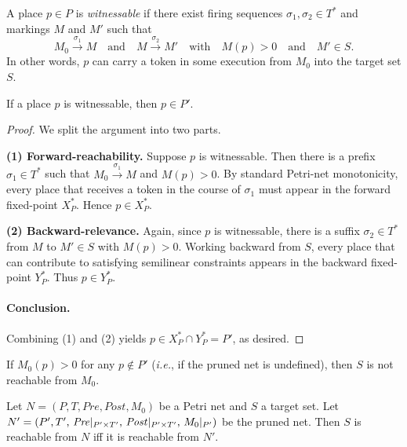 \begin{definition}
	A place $p\in P$ is \emph{witnessable} if there exist firing
	sequences $\sigma_1,\sigma_2\in T^*$ and markings $M$ and $M'$ such that
	\[
	M_0 \xrightarrow{\sigma_1} M
	\quad\text{and}\quad
	M \xrightarrow{\sigma_2} M'
	\quad\text{with}\quad
	M(p)>0
	\quad\text{and}\quad
	M'\in S.
	\]
	In other words, $p$ can carry a token in some execution from $M_0$ into the target set $S$.
\end{definition}

\begin{theorem}
	\label{thm:invariant}
	If a place $p$ is witnessable, then $p\in P'$.
\end{theorem}

\begin{proof}
	We split the argument into two parts.
	
	\medskip
	\noindent
	\textbf{(1) Forward-reachability.}
	Suppose $p$ is witnessable.  Then there is a prefix
	$\sigma_1\in T^*$ such that $M_0\xrightarrow{\sigma_1}M$ and
	$M(p)>0$.  By standard Petri-net monotonicity, every place that
	receives a token in the course of $\sigma_1$ must appear in the
	forward fixed-point $X^*_P$.  Hence $p\in X^*_P$.
	
	\medskip
	\noindent
	\textbf{(2) Backward-relevance.}
	Again, since $p$ is witnessable, there is a suffix
	$\sigma_2\in T^*$ from $M$ to $M'\in S$ with $M(p)>0$.  Working
	backward from $S$, every place that can contribute to satisfying
	semilinear constraints appears in the backward fixed-point $Y^*_P$.
	Thus $p\in Y^*_P$.
	
	\paragraph{Conclusion.}
	Combining (1) and (2) yields $p\in X^*_P\cap Y^*_P = P'$, as desired.
\end{proof}

\begin{corollary}
  If $M_0(p) > 0$ for any $p \not\in P'$ (\textit{i.e.}, if the pruned net is undefined), then $S$ is not reachable from $M_0$.
\end{corollary}

\begin{corollary}
	Let $N = (P, T, Pre, Post, M_0)$ be a Petri net and $S$ a target set.  
	Let $N' = (P',T',\,\mathit{Pre}|_{P'\times T'},\,\mathit{Post}|_{P'\times T'},\,M_0|_{P'})$ be the pruned net.  
	Then $S$ is reachable from $N$ iff it is reachable from $N'$.
\end{corollary}

